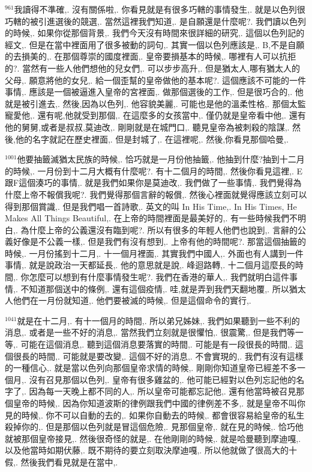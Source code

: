 \documentclass{book}
\begin{document}
$^{961}$我讀得不準確,.
沒有關係啦,.
你看見就是有很多巧轄的事情發生,.
就是以色列很巧轄的被引進選後的競選,.
當然這裡我們知道,.
是自願還是什麼呢?.
我們讀以色列的時候,.
如果你從那個背景,.
我們今天沒有時間來很詳細的研究,.
這個以色列記的經文,.
但是在當中裡面用了很多被動的詞句,.
其實一個以色列應該是,.
B,不是自願的去損美的,.
在那個尊崇的國度裡面,.
皇帝要損基本的時候,.
哪裡有人可以抗拒的?.
當然有一些人他們想他的兒女們,.
可以步步高升,.
但是猶太人,哪有猶太人的父母,.
願意將他的女兒,.
給一個歪幫的皇帝做他的基本呢?.
這個應該不可能的一件事情,.
應該是一個被逼進入皇帝的宮裡面,.
做那個選後的工作,.
但是很巧合的,.
他就是被引進去,.
然後,因為以色列,.
他容貌美麗,.
可能也是他的溫柔性格,.
那個太監寵愛他,.
還有呢,他就受到那個,.
在這麼多的女孩當中,.
僅仍就是皇帝看中他,.
還有他的舅舅,或者是叔叔,莫迪改,.
剛剛就是在城門口,.
聽見皇帝為被刺殺的陰謀,.
然後,他的名字就記在歷史裡面,.
但是封城了,.
在這裡呢,.
然後,你看見那個哈曼,.

$^{1001}$他要抽籤滅猶太民族的時候,.
恰巧就是一月份他抽籤,.
他抽到什麼?抽到十二月的時候,.
一月份到十二月大概有什麼呢?.
有十二個月的時間,.
然後你看見這裡,.
E跟F這個湊巧的事情,.
就是我們如果你是莫迪改,.
我們做了一些事情,.
我們覺得為什麼上帝不報償我呢?.
我們覺得那個言辭的報償,.
然後心裡面就覺得應該立刻可以得到那個賞識,.
但是我們唱一首詩歌,.
英文的叫 In His Time,.
In His Times, He Makes All Things Beautiful,.
在上帝的時間裡面是最美好的,.
有一些時候我們不明白,.
為什麼上帝的公義還沒有臨到呢?.
所以有很多的年輕人他們也說到,.
言辭的公義好像是不公義一樣,.
但是我們有沒有想到,.
上帝有他的時間呢?.
那當這個抽籤的時候,.
一月份搖到十二月,.
十一個月裡面,.
其實我們中國人,.
外面也有人講到一件事情,.
就是說政治一天都延長,.
他的意思就是說,.
峰迴路轉,.
十二個月這麼長的時間,.
你怎麼可以想到有什麼事情發生呢?.
我們在香港的華人,.
我們就明白這件事情,.
不知道那個送中的條例,.
還有這個疫情,.
哇,就是弄到我們天翻地覆,.
所以猶太人他們在一月份就知道,.
他們要被滅的時候,.
但是這個命令的實行,.

$^{1041}$就是在十二月,.
有十一個月的時間,.
所以弟兄姊妹,.
我們如果聽到一些不利的消息,.
或者是一些不好的消息,.
當然我們立刻就是很懼怕,.
很震驚,.
但是我們等一等,.
可能在這個消息,.
聽到這個消息要落實的時間,.
可能是有一段很長的時間,.
這個很長的時間,.
可能就是要改變,.
這個不好的消息,.
不會實現的,.
我們有沒有這樣的一種信心,.
就是當以色列向那個皇帝求情的時候,.
剛剛你知道皇帝已經差不多一個月,.
沒有召見那個以色列,.
皇帝有很多雞盆的,.
他可能已經對以色列忘記他的名字了,.
因為每一天晚上都不同的人,.
所以皇帝可能都忘記他,.
還有他當時被召見那個皇帝的時候,.
因為你知道波斯的律例跟我們中國的律例差不多,.
就是皇帝不叫你見的時候,.
你不可以自動的去的,.
如果你自動去的時候,.
都會很容易給皇帝的私生殺掉你的,.
但是那個以色列就是冒這個危險,.
見那個皇帝,.
就在見的時候,.
恰巧他就被那個皇帝接見,.
然後很奇怪的就是,.
在他剛剛的時候,.
就是哈曼聽到摩迪嘎,.
以及他當時如期伏藤,.
既不期待的要立刻取決摩迪嘎,.
所以他就做了很高大的十假,.
然後我們看見就是在當中,.
\end{document}
